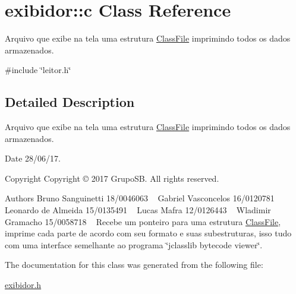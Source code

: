 \hypertarget{classexibidor_1_1c}{}\section{exibidor\+::c Class Reference}
\label{classexibidor_1_1c}


Arquivo que exibe na tela uma estrutura \mbox{\hyperlink{structClassFile}{Class\+File}} imprimindo todos os dados armazenados.  




{\ttfamily \#include \char`\"{}leitor.\+h\char`\"{}}



\subsection{Detailed Description}
Arquivo que exibe na tela uma estrutura \mbox{\hyperlink{structClassFile}{Class\+File}} imprimindo todos os dados armazenados. 

\begin{DoxyDate}{Date}
28/06/17. 
\end{DoxyDate}
\begin{DoxyCopyright}{Copyright}
Copyright © 2017 Grupo\+SB. All rights reserved.
\end{DoxyCopyright}
\begin{DoxyAuthor}{Authors}
Bruno Sanguinetti 18/0046063 ~\newline
Gabriel Vasconcelos 16/0120781 ~\newline
Leonardo de Almeida 15/0135491 ~\newline
Lucas Mafra 12/0126443 ~\newline
Wladimir Gramacho 15/0058718 ~\newline
 Recebe um ponteiro para uma estrutura \mbox{\hyperlink{structClassFile}{Class\+File}}, imprime cada parte de acordo com seu formato e suas subestruturas, isso tudo com uma interface semelhante ao programa \char`\"{}jclasslib bytecode viewer\char`\"{}. 
\end{DoxyAuthor}


The documentation for this class was generated from the following file\+:\begin{DoxyCompactItemize}
\item 
\mbox{\hyperlink{exibidor_8h}{exibidor.\+h}}\end{DoxyCompactItemize}
